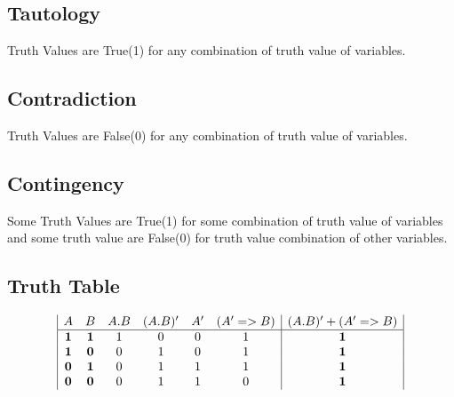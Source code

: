 \documentclass{article}
\begin{document}
\subsection{Tautology}
Truth Values are True(1) for any combination of truth value of variables.

\subsection{Contradiction}
Truth Values are False(0) for any combination of truth value of variables.

\subsection{Contingency}
Some Truth Values are True(1) for some combination of truth value of variables and some truth value are False(0) for  truth value combination of other variables.


\subsection{Truth Table}
\begin{displaymath}
\begin{array}{|c c c c c c|c|}
A & B & A . B & (A . B)' &  A' & (A' => B ) &  (A . B)'+( A' => B) \\ %
\hline %
\textbf{1} & \textbf{1} & 1 & 0 & 0 & 1 & \textbf{1}\\
\textbf{1} & \textbf{0} & 0 & 1 & 0 & 1 & \textbf{1}\\
\textbf{0} & \textbf{1} & 0 & 1 & 1 & 1 & \textbf{1}\\
\textbf{0} & \textbf{0} & 0 & 1 & 1 & 0 & \textbf{1}\\
\end{array}
\end{displaymath}
\end{document}
